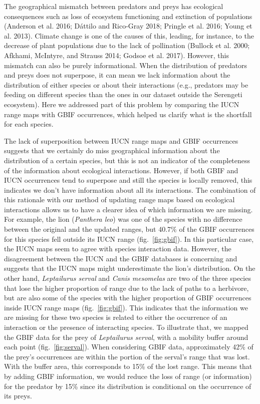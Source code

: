 \documentclass[10pt,oneside]{article}
\begin{document}
The geographical mismatch between predators and preys has ecological
consequences such as loss of ecosystem functioning and extinction of
populations (Anderson et al. 2016; Dáttilo and Rico-Gray 2018; Pringle
et al. 2016; Young et al. 2013). Climate change is one of the causes of
this, leading, for instance, to the decrease of plant populations due to
the lack of pollination (Bullock et al. 2000; Afkhami, McIntyre, and
Strauss 2014; Godsoe et al. 2017). However, this mismatch can also be
purely informational. When the distribution of predators and preys does
not superpose, it can mean we lack information about the distribution of
either species or about their interactions (e.g., predators may be
feeding on different species than the ones in our dataset outside the
Serengeti ecosystem). Here we addressed part of this problem by
comparing the IUCN range maps with GBIF occurrences, which helped us
clarify what is the shortfall for each species.

The lack of superposition between IUCN range maps and GBIF occurrences
suggests that we certainly do miss geographical information about the
distribution of a certain species, but this is not an indicator of the
completeness of the information about ecological interactions. However,
if both GBIF and IUCN occurrences tend to superpose and still the
species is locally removed, this indicates we don't have information
about all its interactions. The combination of this rationale with our
method of updating range maps based on ecological interactions allows us
to have a clearer idea of which information we are missing. For example,
the lion (\emph{Panthera leo}) was one of the species with no difference
between the original and the updated ranges, but 40.7\% of the GBIF
occurrences for this species fell outside its IUCN range
(fig.~\ref{fig:gbif}). In this particular case, the IUCN maps seem to
agree with species interaction data. However, the disagreement between
the IUCN and the GBIF databases is concerning and suggests that the IUCN
maps might underestimate the lion's distribution. On the other hand,
\emph{Leptailurus serval} and \emph{Canis mesomelas} are two of the
three species that lose the higher proportion of range due to the lack
of paths to a herbivore, but are also some of the species with the
higher proportion of GBIF occurrences inside IUCN range maps
(fig.~\ref{fig:gbif}). This indicates that the information we are
missing for these two species is related to either the occurrence of an
interaction or the presence of interacting species. To illustrate that,
we mapped the GBIF data for the prey of \emph{Leptailurus serval}, with
a mobility buffer around each point (fig.~\ref{fig:serval}). When
considering GBIF data, approximately 42\% of the prey's occurrences are
within the portion of the serval's range that was lost. With the buffer
area, this corresponds to 15\% of the lost range. This means that by
adding GBIF information, we would reduce the loss of range (or
information) for the predator by 15\% since its distribution is
conditional on the occurrence of its preys.
\end{document}
